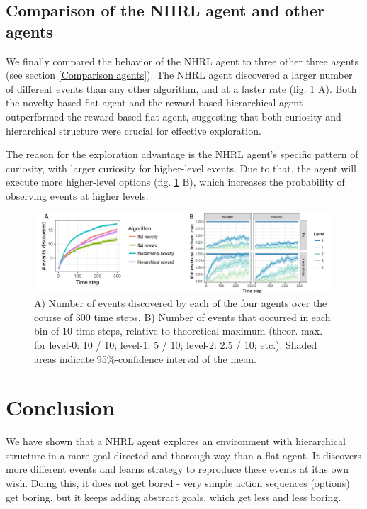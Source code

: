 \documentclass{article}
\begin{document}
\subsection{Comparison of the NHRL agent and other agents} \label{Results compare all}

We finally compared the behavior of the NHRL agent to three other three agents (see section \ref{Comparison agents}). The NHRL agent discovered a larger number of different events than any other algorithm, and at a faster rate (fig. \ref{CEvents} A). Both the novelty-based flat agent and the reward-based hierarchical agent outperformed the reward-based flat agent, suggesting that both curiosity and hierarchical structure were crucial for effective exploration.

The reason for the exploration advantage is the NHRL agent's specific pattern of curiosity, with larger curiosity for higher-level events. Due to that, the agent will execute more higher-level options (fig. \ref{CEvents} B), which increases the probability of observing events at higher levels. 

\begin{figure}[h]
	\centering
	\includegraphics[width=\linewidth]{CEvents.jpg}
	\caption{A) Number of events discovered by each of the four agents over the course of 300 time steps. B) Number of events that occurred in each bin of 10 time steps, relative to theoretical maximum (theor. max. for level-0: 10 / 10; level-1: 5 / 10; level-2: 2.5 / 10; etc.). Shaded areas indicate 95\%-confidence interval of the mean.}
	\label{CEvents}
\end{figure}


\section{Conclusion}

We have shown that a NHRL agent explores an environment with hierarchical structure in a more goal-directed and thorough way than a flat agent. It discovers more different events and learns strategy to reproduce these events at iths own wish. Doing this, it does not get bored - very simple action sequences (options) get boring, but it keeps adding abstract goals, which get less and less boring. 
\end{document}
